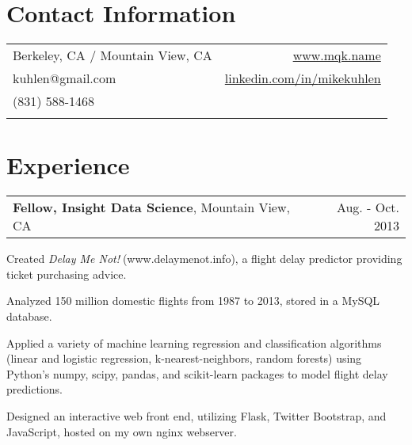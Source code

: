 \begin{resume}

\vspace*{0.15in}

\section{\sc Contact Information}
\vspace*{.05in}
\begin{tabularx}{\textwidth}{Xr}
Berkeley, CA / Mountain View, CA         & \url{www.mqk.name} \\
kuhlen@gmail.com                         & \url{linkedin.com/in/}$\!$\url{mikekuhlen} \\
(831) 588-1468 \\                        & \\
\end{tabularx}

\vspace*{-0.15in}
\section{\sc Experience}
\hspace*{-0.1in}
\begin{tabularx}{1.025\textwidth}{Xr}
\textbf{Fellow, Insight Data Science}, Mountain View, CA & Aug. - Oct. 2013
\end{tabularx}
\vspace*{-0.1in}
\begin{list1}
\item Created \textit{Delay Me Not!}$\;$(www.delaymenot.info), a flight delay predictor providing ticket purchasing advice.
\item Analyzed 150 million domestic flights from 1987 to 2013, stored in a MySQL database.
\item Applied a variety of machine learning regression and classification algorithms (linear and logistic regression, k-nearest-neighbors, random forests) using Python's numpy, scipy, pandas, and scikit-learn packages to model flight delay predictions.
\item Designed an interactive web front end, utilizing Flask, Twitter Bootstrap, and JavaScript, hosted on my own nginx webserver.
\end{list1}


\end{resume}
